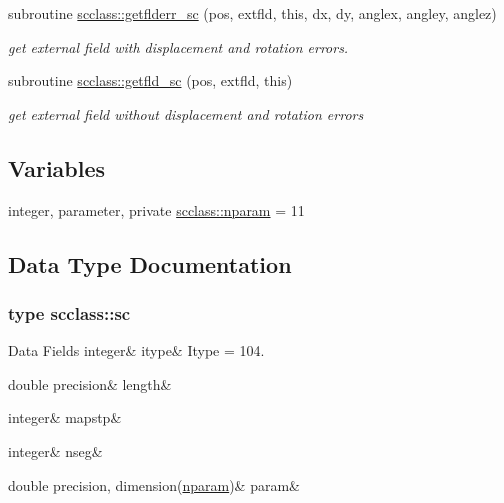 \begin{DoxyCompactItemize}
subroutine \mbox{\hyperlink{namespacescclass_abe42c84df8190cc0443752dff296dd89}{scclass\+::getflderr\+\_\+sc}} (pos, extfld, this, dx, dy, anglex, angley, anglez)
\begin{DoxyCompactList}\small\item\em get external field with displacement and rotation errors. \end{DoxyCompactList}\item 
subroutine \mbox{\hyperlink{namespacescclass_a5af81e94b531e8d02789525f1f4438ac}{scclass\+::getfld\+\_\+sc}} (pos, extfld, this)
\begin{DoxyCompactList}\small\item\em get external field without displacement and rotation errors \end{DoxyCompactList}\end{DoxyCompactItemize}
\subsection*{Variables}
\begin{DoxyCompactItemize}
\item 
integer, parameter, private \mbox{\hyperlink{namespacescclass_a78eec9a89964d83818db291873df4436}{scclass\+::nparam}} = 11
\end{DoxyCompactItemize}


\subsection{Data Type Documentation}
\label{structscclass_1_1sc}
\subsubsection{type scclass\+::sc}
\begin{DoxyFields}{Data Fields}
\mbox{\label{namespacescclass_a4ddd6baf3b915cf7ff25830e84ce6e75}} 
integer&
itype&
Itype = 104. \\
\hline

\mbox{\label{namespacescclass_ae9c1bce2c31838e6ec98bdbfe04cb6d7}} 
double precision&
length&
\\
\hline

\mbox{\label{namespacescclass_ac919c69cd2bb089386f56a5ac75728f0}} 
integer&
mapstp&
\\
\hline

\mbox{\label{namespacescclass_a32cf6178c767aecb2b10b7baa0221c78}} 
integer&
nseg&
\\
\hline

\mbox{\label{namespacescclass_a21e20d06bda8473fab959e3ee29e5183}} 
double precision, dimension(\mbox{\hyperlink{namespacescclass_a78eec9a89964d83818db291873df4436}{nparam}})&
param&
\\
\hline

\end{DoxyFields}
